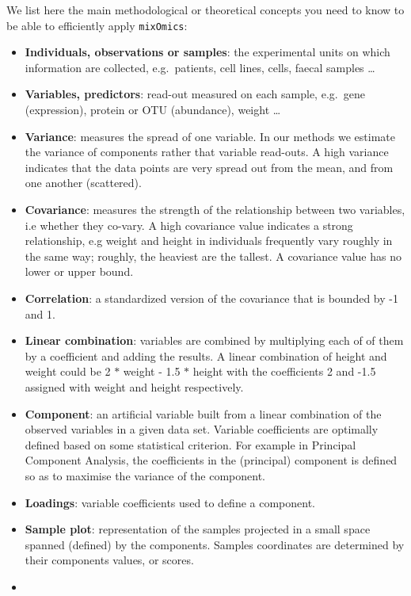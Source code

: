 \documentclass[]{book}
\theoremstyle{definition}
\theoremstyle{definition}
\theoremstyle{definition}
\theoremstyle{remark}
\begin{document}
We list here the main methodological or theoretical concepts you need to
know to be able to efficiently apply \texttt{mixOmics}:

\begin{itemize}
\item
  \textbf{Individuals, observations or samples}: the experimental units
  on which information are collected, e.g.~patients, cell lines, cells,
  faecal samples \ldots{}
\item
  \textbf{Variables, predictors}: read-out measured on each sample,
  e.g.~gene (expression), protein or OTU (abundance), weight \ldots{}
\item
  \textbf{Variance}: measures the spread of one variable. In our methods
  we estimate the variance of components rather that variable read-outs.
  A high variance indicates that the data points are very spread out
  from the mean, and from one another (scattered).
\item
  \textbf{Covariance}: measures the strength of the relationship between
  two variables, i.e whether they co-vary. A high covariance value
  indicates a strong relationship, e.g weight and height in individuals
  frequently vary roughly in the same way; roughly, the heaviest are the
  tallest. A covariance value has no lower or upper bound.
\item
  \textbf{Correlation}: a standardized version of the covariance that is
  bounded by -1 and 1.
\item
  \textbf{Linear combination}: variables are combined by multiplying
  each of of them by a coefficient and adding the results. A linear
  combination of height and weight could be 2 \(*\) weight - 1.5 \(*\)
  height with the coefficients 2 and -1.5 assigned with weight and
  height respectively.
\item
  \textbf{Component}: an artificial variable built from a linear
  combination of the observed variables in a given data set. Variable
  coefficients are optimally defined based on some statistical
  criterion. For example in Principal Component Analysis, the
  coefficients in the (principal) component is defined so as to maximise
  the variance of the component.
\item
  \textbf{Loadings}: variable coefficients used to define a component.
\item
  \textbf{Sample plot}: representation of the samples projected in a
  small space spanned (defined) by the components. Samples coordinates
  are determined by their components values, or scores.
\item

\end{itemize}
\end{document}
